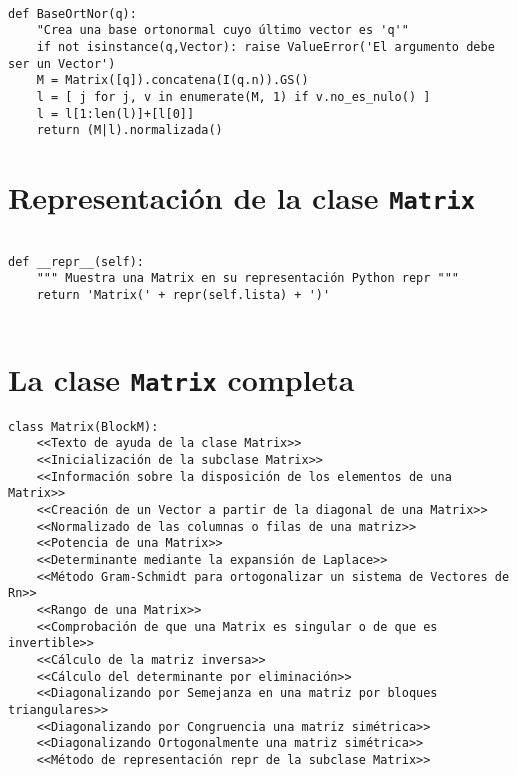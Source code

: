 \documentclass[11pt]{report}
\begin{document}
\begin{verbatim}

def BaseOrtNor(q):
    "Crea una base ortonormal cuyo último vector es 'q'"
    if not isinstance(q,Vector): raise ValueError('El argumento debe ser un Vector')
    M = Matrix([q]).concatena(I(q.n)).GS()
    l = [ j for j, v in enumerate(M, 1) if v.no_es_nulo() ]
    l = l[1:len(l)]+[l[0]]
    return (M|l).normalizada()

\end{verbatim}

\section{Representación de la clase \texttt{Matrix}}
\label{sec:org3cdb28d}

\begin{verbatim}

def __repr__(self):
    """ Muestra una Matrix en su representación Python repr """
    return 'Matrix(' + repr(self.lista) + ')'
                           
\end{verbatim}

\section{La clase \texttt{Matrix} completa}
\label{sec:orgd2e0264}

\begin{verbatim}
class Matrix(BlockM):
    <<Texto de ayuda de la clase Matrix>>
    <<Inicialización de la subclase Matrix>>
    <<Información sobre la disposición de los elementos de una Matrix>>
    <<Creación de un Vector a partir de la diagonal de una Matrix>>
    <<Normalizado de las columnas o filas de una matriz>>
    <<Potencia de una Matrix>>
    <<Determinante mediante la expansión de Laplace>>
    <<Método Gram-Schmidt para ortogonalizar un sistema de Vectores de Rn>>
    <<Rango de una Matrix>>
    <<Comprobación de que una Matrix es singular o de que es invertible>>
    <<Cálculo de la matriz inversa>>
    <<Cálculo del determinante por eliminación>>
    <<Diagonalizando por Semejanza en una matriz por bloques triangulares>>
    <<Diagonalizando por Congruencia una matriz simétrica>>
    <<Diagonalizando Ortogonalmente una matriz simétrica>>
    <<Método de representación repr de la subclase Matrix>>
\end{verbatim}
\end{document}
